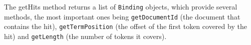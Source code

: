 The getHits method returns a list of {\tt Binding} objects, which provide
several methods, the most important ones being {\tt getDocumentId} (the
document that contains the hit), {\tt getTermPosition} (the offset of the first
token covered by the hit) and {\tt getLength} (the number of tokens it
covers).
